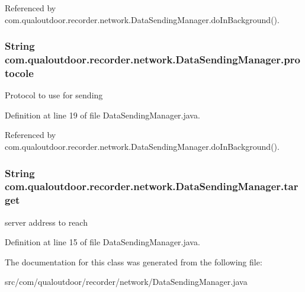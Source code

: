 Referenced by com.\-qualoutdoor.\-recorder.\-network.\-Data\-Sending\-Manager.\-do\-In\-Background().

\hypertarget{classcom_1_1qualoutdoor_1_1recorder_1_1network_1_1DataSendingManager_a48eb8da2edfe089c9685e47b9450910e}{
\subsubsection[{protocole}]{\setlength{\rightskip}{0pt plus 5cm}String com.\-qualoutdoor.\-recorder.\-network.\-Data\-Sending\-Manager.\-protocole\hspace{0.3cm}{\ttfamily [private]}}}\label{classcom_1_1qualoutdoor_1_1recorder_1_1network_1_1DataSendingManager_a48eb8da2edfe089c9685e47b9450910e}
Protocol to use for sending 

Definition at line 19 of file Data\-Sending\-Manager.\-java.



Referenced by com.\-qualoutdoor.\-recorder.\-network.\-Data\-Sending\-Manager.\-do\-In\-Background().

\hypertarget{classcom_1_1qualoutdoor_1_1recorder_1_1network_1_1DataSendingManager_a374bd611a2fa799541bafdda13fb442b}{
\subsubsection[{target}]{\setlength{\rightskip}{0pt plus 5cm}String com.\-qualoutdoor.\-recorder.\-network.\-Data\-Sending\-Manager.\-target\hspace{0.3cm}{\ttfamily [private]}}}\label{classcom_1_1qualoutdoor_1_1recorder_1_1network_1_1DataSendingManager_a374bd611a2fa799541bafdda13fb442b}
server address to reach 

Definition at line 15 of file Data\-Sending\-Manager.\-java.



The documentation for this class was generated from the following file\-:\begin{DoxyCompactItemize}
\item 
src/com/qualoutdoor/recorder/network/Data\-Sending\-Manager.\-java\end{DoxyCompactItemize}
